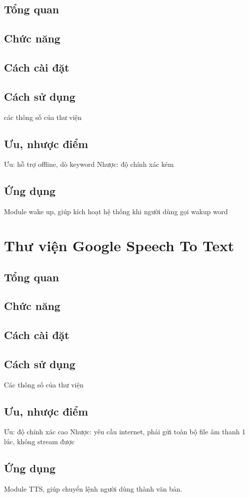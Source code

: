 \subsection{Tổng quan}
\subsection{Chức năng}
\subsection{Cách cài đặt}
\subsection{Cách sử dụng}
các thông số của thư viện
\subsection{Ưu, nhược điểm}
Ưu: hỗ trợ offline, dò keyword
Nhược: độ chính xác kém
\subsection{Ứng dụng}
Module wake up, giúp kích hoạt hệ thống khi người dùng gọi wakup word
\section{Thư viện Google Speech To Text}
\subsection{Tổng quan}
\subsection{Chức năng}
\subsection{Cách cài đặt}
\subsection{Cách sử dụng}
Các thông số của thư viện
\subsection{Ưu, nhược điểm}
Ưu: độ chính xác cao
Nhược: yêu cầu internet, phải gửi toàn bộ file âm thanh 1 lúc, không stream được
\subsection{Ứng dụng}
Module TTS, giúp chuyển lệnh người dùng thành văn bản.